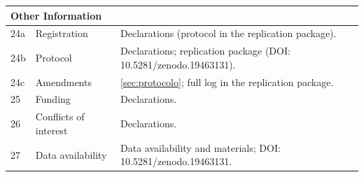 \begin{longtable}{p{0.5cm}p{4.5cm}p{8.5cm}}
\midrule
\multicolumn{3}{l}{\textbf{Other Information}} \\
\midrule
24a & Registration
    & Declarations (protocol in the replication package). \\
24b & Protocol
    & Declarations; replication package (DOI: 10.5281/zenodo.19463131). \\
24c & Amendments
    & \autoref{sec:protocolo}; full log in the replication package. \\
25  & Funding
    & Declarations. \\
26  & Conflicts of interest
    & Declarations. \\
27  & Data availability
    & Data availability and materials; DOI: 10.5281/zenodo.19463131. \\
\end{longtable}
